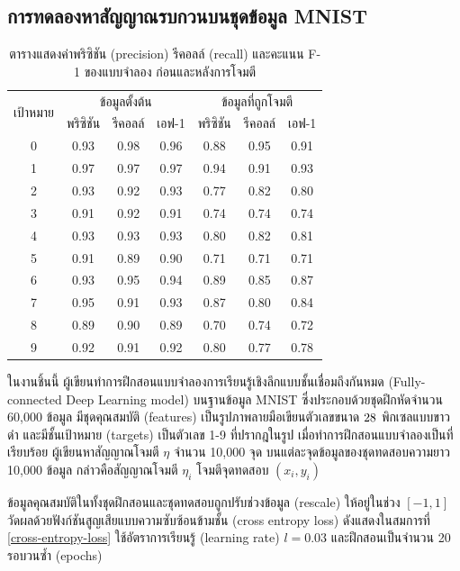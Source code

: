 \documentclass{cpepaper}
\begin{document}
\subsection{การทดลองหาสัญญาณรบกวนบนชุดข้อมูล MNIST}

\begin{table}
    \centering
    \begin{tabular}{c|ccc|ccc}
        \hline \hline
        \multirow{2}{*}{เป้าหมาย} & \multicolumn{3}{c|}{ข้อมูลตั้งต้น} & \multicolumn{3}{c}{ข้อมูลที่ถูกโจมตี}\\
        \cline{2-7}
        & พริซิชัน & รีคอลล์ & เอฟ-1 & พริซิชัน & รีคอลล์ & เอฟ-1 \\
        \hline
        0 & 0.93 & 0.98 & 0.96 & 0.88 & 0.95 & 0.91 \\
        1 & 0.97 & 0.97 & 0.97 & 0.94 & 0.91 & 0.93 \\
        2 & 0.93 & 0.92 & 0.93 & 0.77 & 0.82 & 0.80 \\
        3 & 0.91 & 0.92 & 0.91 & 0.74 & 0.74 & 0.74 \\
        4 & 0.93 & 0.93 & 0.93 & 0.80 & 0.82 & 0.81 \\
        5 & 0.91 & 0.89 & 0.90 & 0.71 & 0.71 & 0.71 \\
        6 & 0.93 & 0.95 & 0.94 & 0.89 & 0.85 & 0.87 \\
        7 & 0.95 & 0.91 & 0.93 & 0.87 & 0.80 & 0.84 \\
        8 & 0.89 & 0.90 & 0.89 & 0.70 & 0.74 & 0.72 \\
        9 & 0.92 & 0.91 & 0.92 & 0.80 & 0.77 & 0.78\\
        \hline \hline
    \end{tabular}
    \caption{ตารางแสดงค่าพริซิชัน (precision) รีคอลล์ (recall) และคะแนน F-1 ของแบบจำลอง ก่อนและหลังการโจมตี}
    \label{model-table}
\end{table}

ในงานชิ้นนี้ ผู้เขียนทำการฝึกสอนแบบจำลองการเรียนรู้เชิงลึกแบบชั้นเชื่อมถึงกันหมด (Fully-connected Deep Learning model) บนฐานข้อมูล MNIST ซึ่งประกอบด้วยชุดฝึกหัดจำนวน 60,000 ข้อมูล มีชุดคุณสมบัติ (features) เป็นรูปภาพลายมือเขียนตัวเลขขนาด $28 \time 28$ พิกเซลแบบขาวดำ และมีชั้นเป้าหมาย (targets) เป็นตัวเลข 1-9 ที่ปรากฎในรูป เมื่อทำการฝึกสอนแบบจำลองเป็นที่เรียบร้อย ผู้เขียนหาสัญญาณโจมตี $\eta$ จำนวน 10,000 จุด บนแต่ละจุดข้อมูลของชุดทดสอบความยาว 10,000 ข้อมูล กล่าวคือสัญญาณโจมตี $\eta_i$ โจมตีจุดทดสอบ $\left(x_i, y_i \right)$

ข้อมูลคุณสมบัติในทั้งชุดฝึกสอนและชุดทดสอบถูกปรับช่วงข้อมูล (rescale) ให้อยู่ในช่วง $\left[-1, 1\right]$ วัดผลด้วยฟังก์ชันสูญเสียแบบความซับซ้อนข้ามชั้น (cross entropy loss) ดังแสดงในสมการที่ \ref{cross-entropy-loss} ใช้อัตราการเรียนรู้ (learning rate) $l = 0.03$ และฝึกสอนเป็นจำนวน 20 รอบวนซ้ำ (epochs)
\end{document}
